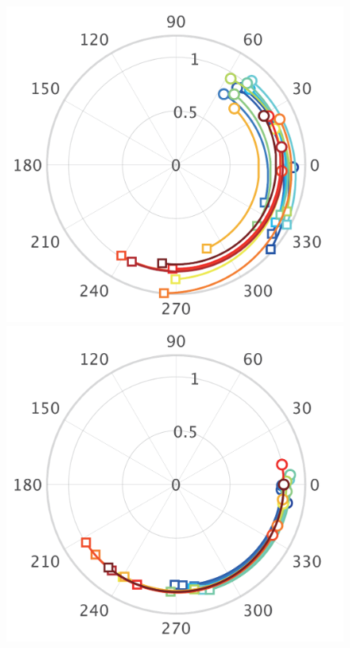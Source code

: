 \documentclass[graybox, envcountchap]{svmult}
\begin{document}
\begin{figure}[t!]
  \centering
  {
  \begin{minipage}{0.49\linewidth}
    \centering
    \includegraphics[width = 0.9\linewidth]{figs/Epolar}
    \medskip
  \end{minipage}
  \begin{minipage}{0.49\linewidth}
    \centering
    \includegraphics[width = 0.9\linewidth]{figs/Vpolar}
    \medskip

\end{minipage}}
\end{figure}
\end{document}
